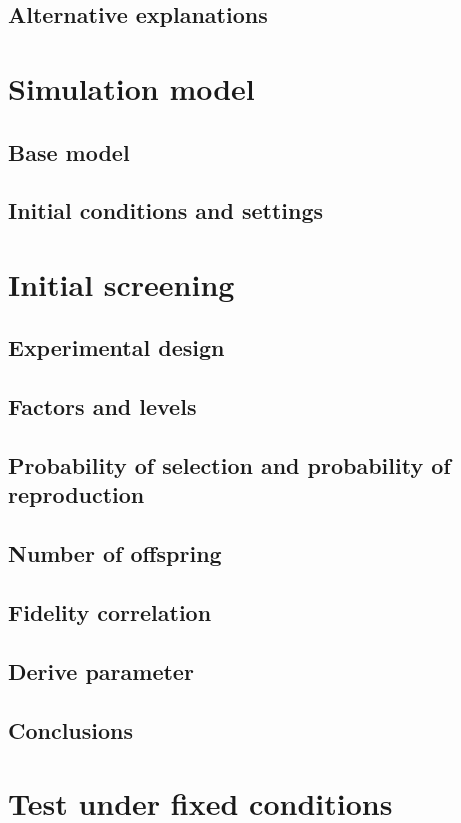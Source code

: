 \documentclass[]{report}
\begin{document}
\section{Alternative explanations}

\chapter{Simulation model}
\section{Base model}
\section{Initial conditions and settings}

\chapter{Initial screening}
\section{Experimental design}
\section{Factors and levels}
\section{Probability of selection and probability of reproduction}
\section{Number of offspring}
\section{Fidelity correlation}
\section{Derive parameter}
\section{Conclusions}

\chapter{Test under fixed conditions}
\end{document}
